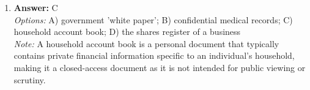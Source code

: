 \documentclass[12pt]{article}
\begin{document}
\begin{enumerate}[label=\arabic*.]
\\ \textit{Note:} The correct answer highlights that traditional working-class identity was shaped by strong local community ties, extensive family connections, and collective recreational activities, which fostered a sense of belonging and social cohesion within the working class.
\item \textbf{Answer:} C
\\ \textit{Options:} A) government 'white paper'; B) confidential medical records; C) household account book; D) the shares register of a business
\\ \textit{Note:} A household account book is a personal document that typically contains private financial information specific to an individual's household, making it a closed-access document as it is not intended for public viewing or scrutiny.
\end{enumerate}
\end{document}
